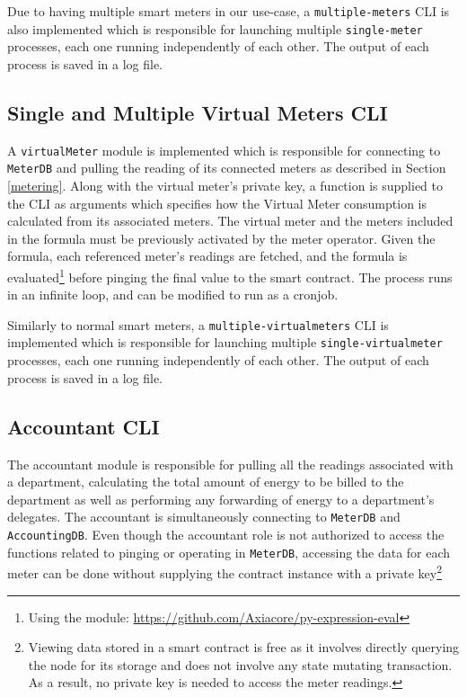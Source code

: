 Due to having multiple smart meters in our use-case, a \texttt{multiple-meters} CLI is also implemented which is responsible for launching multiple \texttt{single-meter} processes, each one running independently of each other. The output of each process is saved in a log file. 

\subsection{Single and Multiple Virtual Meters CLI}

A \texttt{virtualMeter} module is implemented which is responsible for connecting to \texttt{MeterDB} and pulling the reading of its connected meters as described in Section \ref{metering}. Along with the virtual meter's private key, a function is supplied to the CLI as arguments which specifies how the Virtual Meter consumption is calculated from its associated meters. The virtual meter and the meters included in the formula must be previously activated by the meter operator. Given the formula, each referenced meter's readings are fetched, and the formula is evaluated\footnote{Using the module: \url{https://github.com/Axiacore/py-expression-eval}} before pinging the final value to the smart contract. The process runs in an infinite loop, and can be modified to run as a cronjob.

Similarly to normal smart meters, a \texttt{multiple-virtualmeters} CLI is implemented which is responsible for launching multiple \texttt{single-virtualmeter} processes, each one running independently of each other. The output of each process is saved in a log file.

\subsection{Accountant CLI}
The accountant module is responsible for pulling all the readings associated with a department, calculating the total amount of energy to be billed to the department as well as performing any forwarding of energy to a department's delegates. The accountant is simultaneously connecting to \texttt{MeterDB} and \texttt{AccountingDB}. Even though the accountant role is not authorized to access the functions related to pinging or operating in \texttt{MeterDB}, accessing the data for each meter can be done without supplying the contract instance with a private key\footnote{Viewing data stored in a smart contract is free as it involves directly querying the node for its storage and does not involve any state mutating transaction. As a result, no private key is needed to access the meter readings.} 

